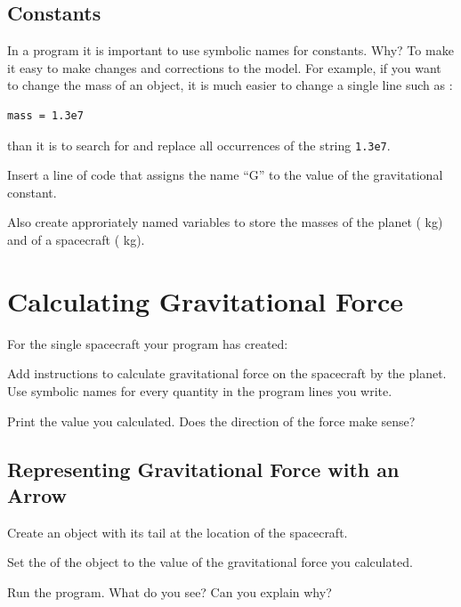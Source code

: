 \documentclass[11pt]{article}
\begin{document}
\subsection{Constants}

In a program it is important to use symbolic names for constants.  Why?  To make it easy to make changes and corrections to the model.  For example, if you want to change the mass of an object, it is much easier to change a single line such as :

\color{CodeColor}
\begin{verbatim}
mass = 1.3e7
\end{verbatim}
\color{black}

than it is to search for and replace all occurrences of the string \color{CodeColor}\texttt{1.3e7}\color{black}.\\

\begin{compactitem}[\color{MIRed}$\Rightarrow$]
\item Insert a line of code that assigns the name ``G'' to the value of the gravitational constant.
\item Also create approriately named variables to store the masses of the planet ( kg) and of a spacecraft ( kg).\\
\end{compactitem}

\section{Calculating Gravitational Force}

For the single spacecraft your program has created:\\
\begin{compactitem}[\color{MIRed}$\Rightarrow$]
\item Add instructions to calculate gravitational force on the spacecraft by the planet. Use symbolic names for every quantity in the program lines you write.
\item Print the value you calculated.  Does the direction of the force make sense?
\end{compactitem}

\subsection{Representing Gravitational Force with an Arrow}  

\begin{compactitem}[\color{MIRed}$\Rightarrow$]
\item Create an  object with its tail at the location of the spacecraft.  
\item Set the  of the  object to the value of the gravitational force you calculated.
\item Run the program.  What do you see?  Can you explain why?
\end{compactitem}
\end{document}

